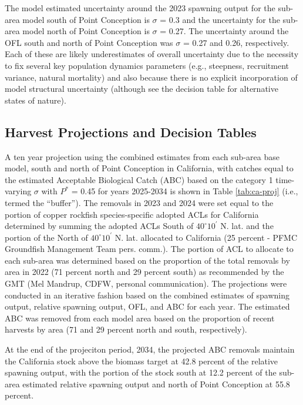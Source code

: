 \documentclass[11pt,
  english,
  letterpaper,
]{article}
\begin{document}
The model estimated uncertainty around the 2023 spawning output for the sub-area model south of Point Conception is \(\sigma\) = 0.3 and the uncertainty for the sub-area model north of Point Conception is \(\sigma\) = 0.27. The uncertainty around the OFL south and north of Point Conception was \(\sigma\) = 0.27 and 0.26, respectively. Each of these are likely underestimates of overall uncertainty due to the necessity to fix several key population dynamics parameters (e.g., steepness, recruitment variance, natural mortality) and also because there is no explicit incorporation of model structural uncertainty (although see the decision table for alternative states of nature).

\hypertarget{harvest-projections-and-decision-tables}{%
\subsection{Harvest Projections and Decision Tables}\label{harvest-projections-and-decision-tables}}

A ten year projection using the combined estimates from each sub-area base model, south and north of Point Conception in California, with catches equal to the estimated Acceptable Biological Catch (ABC) based on the category 1 time-varying \(\sigma\) with \(P^*\) = 0.45 for years 2025-2034 is shown in Table \ref{tab:ca-proj} (i.e., termed the ``buffer''). The removals in 2023 and 2024 were set equal to the portion of copper rockfish species-specific adopted ACLs for California determined by summing the adopted ACLs South of $40^\circ 10^\prime$ N. lat. and the portion of the North of $40^\circ 10^\prime$ N. lat. allocated to California (25 percent - PFMC Groundfish Management Team pers. comm.). The portion of ACL to allocate to each sub-area was determined based on the proportion of the total removals by area in 2022 (71 percent north and 29 percent south) as recommended by the GMT (Mel Mandrup, CDFW, personal communication). The projections were conducted in an iterative fashion based on the combined estimates of spawning output, relative spawning output, OFL, and ABC for each year. The estimated ABC was removed from each model area based on the proportion of recent harvests by area (71 and 29 percent north and south, respectively).

At the end of the projeciton period, 2034, the projected ABC removals maintain the California stock above the biomass target at 42.8 percent of the relative spawning output, with the portion of the stock south at 12.2 percent of the sub-area estimated relative spawning output and north of Point Conception at 55.8 percent.
\end{document}
